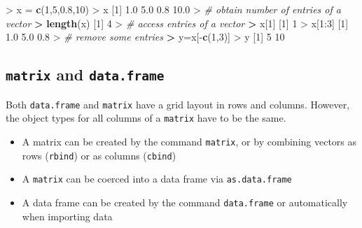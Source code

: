 \documentclass[]{article}
\newenvironment{Shaded}{\begin{snugshade}}{\end{snugshade}}
\newcommand{\KeywordTok}[1]{\textcolor[rgb]{0.13,0.29,0.53}{\textbf{{#1}}}}
\newcommand{\DecValTok}[1]{\textcolor[rgb]{0.00,0.00,0.81}{{#1}}}
\newcommand{\FloatTok}[1]{\textcolor[rgb]{0.00,0.00,0.81}{{#1}}}
\newcommand{\StringTok}[1]{\textcolor[rgb]{0.31,0.60,0.02}{{#1}}}
\newcommand{\CommentTok}[1]{\textcolor[rgb]{0.56,0.35,0.01}{\textit{{#1}}}}
\newcommand{\ErrorTok}[1]{\textcolor[rgb]{0.64,0.00,0.00}{\textbf{{#1}}}}
\newcommand{\NormalTok}[1]{{#1}}
\providecommand{\tightlist}{%
  \setlength{\itemsep}{0pt}\setlength{\parskip}{0pt}}
\begin{document}
\begin{Shaded}
\begin{Highlighting}[]
\NormalTok{>}\StringTok{ }\NormalTok{x =}\StringTok{ }\KeywordTok{c}\NormalTok{(}\DecValTok{1}\NormalTok{,}\DecValTok{5}\NormalTok{,}\FloatTok{0.8}\NormalTok{,}\DecValTok{10}\NormalTok{)}
\NormalTok{>}\StringTok{ }\NormalTok{x}
\NormalTok{[}\DecValTok{1}\NormalTok{]  }\FloatTok{1.0}  \FloatTok{5.0}  \FloatTok{0.8} \FloatTok{10.0}
\NormalTok{>}\StringTok{ }\CommentTok{# obtain number of entries of a vector}
\ErrorTok{>}\StringTok{ }\KeywordTok{length}\NormalTok{(x)}
\NormalTok{[}\DecValTok{1}\NormalTok{] }\DecValTok{4}
\NormalTok{>}\StringTok{ }\CommentTok{# access entries of a vector}
\ErrorTok{>}\StringTok{ }\NormalTok{x[}\DecValTok{1}\NormalTok{]}
\NormalTok{[}\DecValTok{1}\NormalTok{] }\DecValTok{1}
\NormalTok{>}\StringTok{ }\NormalTok{x[}\DecValTok{1}\NormalTok{:}\DecValTok{3}\NormalTok{]}
\NormalTok{[}\DecValTok{1}\NormalTok{] }\FloatTok{1.0} \FloatTok{5.0} \FloatTok{0.8}
\NormalTok{>}\StringTok{ }\CommentTok{# remove some entries}
\ErrorTok{>}\StringTok{ }\NormalTok{y=x[-}\KeywordTok{c}\NormalTok{(}\DecValTok{1}\NormalTok{,}\DecValTok{3}\NormalTok{)]}
\NormalTok{>}\StringTok{ }\NormalTok{y}
\NormalTok{[}\DecValTok{1}\NormalTok{]  }\DecValTok{5} \DecValTok{10}
\end{Highlighting}
\end{Shaded}

\subsection{\texorpdfstring{\texttt{matrix} and
\texttt{data.frame}}{matrix and data.frame}}\label{matrix-and-data.frame}

Both \texttt{data.frame} and \texttt{matrix} have a grid layout in rows
and columns. However, the object types for all columns of a
\texttt{matrix} have to be the same.

\begin{itemize}
\tightlist
\item
  A matrix can be created by the command \texttt{matrix}, or by
  combining vectors as rows (\texttt{rbind}) or as columns
  (\texttt{cbind})
\item
  A \texttt{matrix} can be coerced into a data frame via
  \texttt{as.data.frame}
\item
  A data frame can be created by the command \texttt{data.frame} or
  automatically when importing data
\end{itemize}
\end{document}
